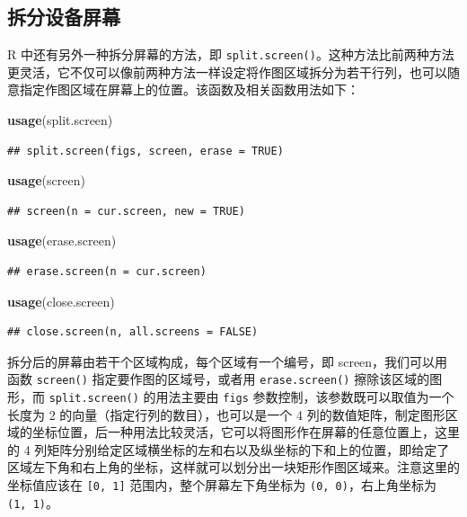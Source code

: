\documentclass[
  b5paper,
  UTF8,twoside]{book}
\newenvironment{Shaded}{\begin{snugshade}}{\end{snugshade}}
\newcommand{\FunctionTok}[1]{\textcolor[rgb]{0.13,0.29,0.53}{\textbf{#1}}}
\newcommand{\NormalTok}[1]{#1}
\begin{document}
\subsection{拆分设备屏幕}\label{ux62c6ux5206ux8bbeux5907ux5c4fux5e55}

R 中还有另外一种拆分屏幕的方法，即 \texttt{split.screen()}。这种方法比前两种方法更灵活，它不仅可以像前两种方法一样设定将作图区域拆分为若干行列，也可以随意指定作图区域在屏幕上的位置。该函数及相关函数用法如下：

\begin{Shaded}
\begin{Highlighting}[]
\FunctionTok{usage}\NormalTok{(split.screen)}
\end{Highlighting}
\end{Shaded}

\begin{verbatim}
## split.screen(figs, screen, erase = TRUE)
\end{verbatim}

\begin{Shaded}
\begin{Highlighting}[]
\FunctionTok{usage}\NormalTok{(screen)}
\end{Highlighting}
\end{Shaded}

\begin{verbatim}
## screen(n = cur.screen, new = TRUE)
\end{verbatim}

\begin{Shaded}
\begin{Highlighting}[]
\FunctionTok{usage}\NormalTok{(erase.screen)}
\end{Highlighting}
\end{Shaded}

\begin{verbatim}
## erase.screen(n = cur.screen)
\end{verbatim}

\begin{Shaded}
\begin{Highlighting}[]
\FunctionTok{usage}\NormalTok{(close.screen)}
\end{Highlighting}
\end{Shaded}

\begin{verbatim}
## close.screen(n, all.screens = FALSE)
\end{verbatim}

拆分后的屏幕由若干个区域构成，每个区域有一个编号，即 screen，我们可以用函数 \texttt{screen()} 指定要作图的区域号，或者用 \texttt{erase.screen()} 擦除该区域的图形，而 \texttt{split.screen()} 的用法主要由 \texttt{figs} 参数控制，该参数既可以取值为一个长度为 2 的向量（指定行列的数目），也可以是一个 4 列的数值矩阵，制定图形区域的坐标位置，后一种用法比较灵活，它可以将图形作在屏幕的任意位置上，这里的 4 列矩阵分别给定区域横坐标的左和右以及纵坐标的下和上的位置，即给定了区域左下角和右上角的坐标，这样就可以划分出一块矩形作图区域来。注意这里的坐标值应该在 \texttt{{[}0,\ 1{]}} 范围内，整个屏幕左下角坐标为 \texttt{(0,\ 0)}，右上角坐标为 \texttt{(1,\ 1)}。
\end{document}
